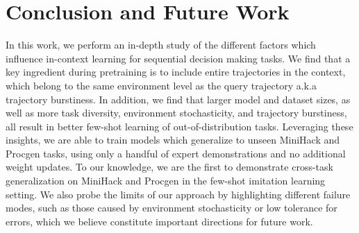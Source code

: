 \documentclass[]{fairmeta}
\begin{document}
  \begin{table}[t]
\centering
\label{tab:related_works}
\caption{Comparison of our work with different related works}
\end{table}
\section{Conclusion and Future Work}
In this work, we perform an in-depth study of the different factors which influence in-context learning for sequential decision making tasks.
We find that a key ingredient during pretraining is to include entire trajectories in the context, which belong to the same environment level as the query trajectory a.k.a trajectory burstiness.
In addition, we find that larger model and dataset sizes, as well as more task diversity, environment stochasticity, and trajectory burstiness, all result in better few-shot learning of out-of-distribution tasks.
Leveraging these insights, we are able to train models which generalize to unseen MiniHack and Procgen tasks, using only a handful of expert demonstrations and no additional weight updates. To our knowledge, we are the first to demonstrate cross-task generalization on MiniHack and Procgen in the few-shot imitation learning setting. We also probe the limits of our approach by highlighting different failure modes, such as those caused by environment stochasticity or low tolerance for errors, which we believe constitute important directions for future work.
\clearpage
\newpage


\clearpage
\newpage
\beginappendix
\appendix
\onecolumn
\end{document}
